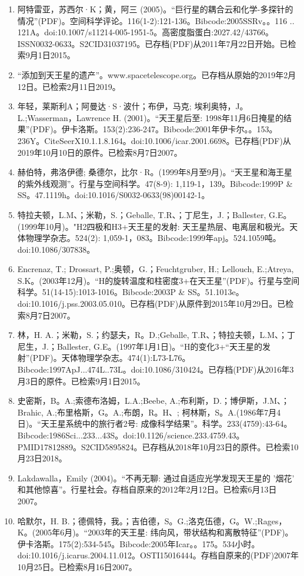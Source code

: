 \begin{enumerate}
\item 阿特雷亚，苏西尔·K；黄，阿三 (2005)。“巨行星的耦合云和化学-多探针的情况”(PDF)。空间科学评论。116(1-2):121-136。Bibcode:2005SSRv。。116 .. 121A。doi:10.1007/s11214-005-1951-5。高密度脂蛋白:2027.42/43766。ISSN0032-0633。S2CID31037195。已存档(PDF)从2011年7月22日开始。已检索9月1日2015。   
\item “添加到天王星的遗产”。www.spacetelescope.org。已存档从原始的2019年2月12日。已检索2月11日2019。
\item 年轻，莱斯利A；阿曼达·S·波什；布伊，马克; 埃利奥特，J。L.;Wasserman，Lawrence H. (2001)。“天王星后至: 1998年11月6日掩星的结果”(PDF)。伊卡洛斯。153(2):236-247。Bibcode:2001年伊卡尔。。153。236Y。CiteSeerX10.1.1.8.164。doi:10.1006/icar.2001.6698。已存档(PDF)从2019年10月10日的原件。已检索8月7日2007。  
\item 赫伯特，弗洛伊德; 桑德尔，比尔·R。(1999年8月至9月)。“天王星和海王星的紫外线观测”。行星与空间科学。47(8-9): 1,119-1，139。Bibcode:1999P & SS。47.1119h。doi:10.1016/S0032-0633(98)00142-1。
\item 特拉夫顿，L.M、；米勒，S.；Geballe, T.R、；丁尼生，J.；Ballester, G.E。(1999年10月)。"H2四极和H3+天王星的发射: 天王星热层、电离层和极光。天体物理学杂志。524(2): 1,059-1，083。Bibcode:1999年apj。524.1059吨。doi:10.1086/307838。
\item Encrenaz, T.; Drossart, P.;奥顿，G.；Feuchtgruber, H.; Lellouch, E.;Atreya, S.K。(2003年12月)。“H的旋转温度和柱密度3+在天王星”(PDF)。行星与空间科学。51(14-15):1013-1016。Bibcode:2003P & SS。51.1013e。doi:10.1016/j.pss.2003.05.010。已存档(PDF)从原件到2015年10月29日。已检索8月7日2007。
\item 林，H. A.；米勒，S.；约瑟夫，R。D.;Geballe, T.R、；特拉夫顿，L.M、；丁尼生，J.；Ballester, G.E。(1997年1月1日)。“H的变化3+“天王星的发射”(PDF)。天体物理学杂志。474(1):L73-L76。Bibcode:1997ApJ...474L..73L。doi:10.1086/310424。已存档(PDF)从2016年3月3日的原件。已检索9月1日2015。
\item 史密斯，B。A.;索德布洛姆，L.A.;Beebe, A.;布利斯，D.；博伊斯，J.M、；Brahic, A.;布里格斯，G。A.;布朗，R。H、; 柯林斯，S。A.(1986年7月4日)。“天王星系统中的旅行者2号: 成像科学结果”。科学。233(4759):43-64。Bibcode:1986Sci...233...43S。doi:10.1126/science.233.4759.43。PMID17812889。S2CID5895824。已存档从2018年10月23日的原件。已检索10月23日2018。   
\item Lakdawalla，Emily (2004)。“不再无聊: 通过自适应光学发现天王星的 '烟花' 和其他惊喜”。行星社会。存档自原来的2012年2月12日。已检索6月13日2007。
\item 哈默尔，H. B.；德佩特，我。；吉伯德，S。G.;洛克伍德，G。W.;Rages，K。(2005年6月)。“2003年的天王星: 纬向风，带状结构和离散特征”(PDF)。伊卡洛斯。175(2):534-545。Bibcode:2005年Icar。。175。534小时。doi:10.1016/j.icarus.2004.11.012。OSTI15016444。存档自原来的(PDF)2007年10月25日。已检索8月16日2007。  

\end{enumerate}
